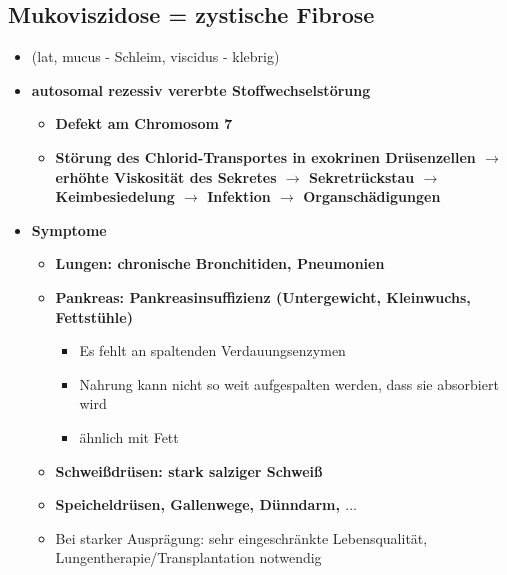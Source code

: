 \subsection{Mukoviszidose = zystische Fibrose}
	\begin{itemize}
		\item (lat, mucus - Schleim, viscidus - klebrig) 
		\item \textbf{autosomal rezessiv vererbte Stoffwechselstörung}
			\begin{itemize}
				\item \textbf{Defekt am Chromosom 7}
				\item \textbf{Störung des Chlorid-Transportes in exokrinen Drüsenzellen $\rightarrow$ erhöhte Viskosität des Sekretes $\rightarrow$ Sekretrückstau $\rightarrow$ Keimbesiedelung $\rightarrow$ Infektion $\rightarrow$ Organschädigungen}
			\end{itemize}
		\item \textbf{Symptome}
			\begin{itemize}
				\item \textbf{Lungen: chronische Bronchitiden, Pneumonien}
				\item \textbf{Pankreas: Pankreasinsuffizienz (Untergewicht, Kleinwuchs, Fettstühle)}
					\begin{itemize}
						\item Es fehlt an spaltenden Verdauungsenzymen
						\item Nahrung kann nicht so weit aufgespalten werden, dass sie absorbiert wird
						\item ähnlich mit Fett
					\end{itemize}
				\item \textbf{Schweißdrüsen: stark salziger Schweiß}
				\item \textbf{Speicheldrüsen, Gallenwege, Dünndarm, $\dots$}
				\item Bei starker Ausprägung: sehr eingeschränkte Lebensqualität, Lungentherapie/Transplantation notwendig
			\end{itemize}
	\end{itemize}
	
